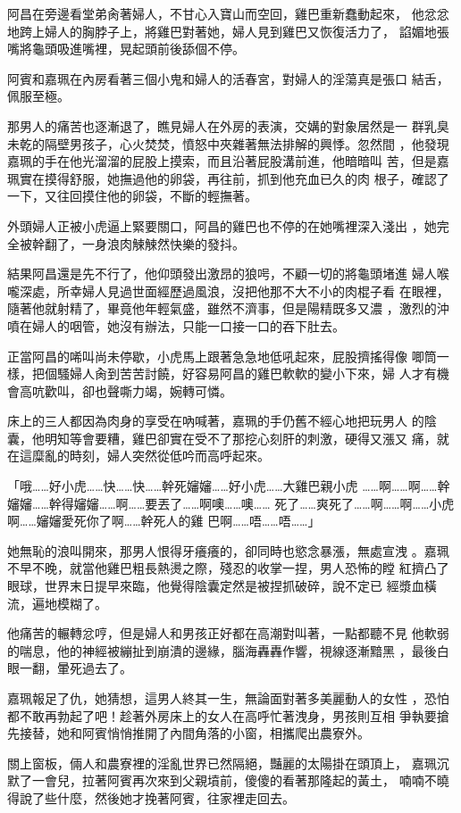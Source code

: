 阿昌在旁邊看堂弟肏著婦人，不甘心入寶山而空回，雞巴重新蠢動起來，
他忿忿地跨上婦人的胸脖子上，將雞巴對著她，婦人見到雞巴又恢復活力了，
諂媚地張嘴將龜頭吸進嘴裡，晃起頭前後舔個不停。

阿賓和嘉珮在內房看著三個小鬼和婦人的活春宮，對婦人的淫蕩真是張口
結舌，佩服至極。

那男人的痛苦也逐漸退了，瞧見婦人在外房的表演，交媾的對象居然是一
群乳臭未乾的隔壁男孩子，心火焚焚，憤怒中夾雜著無法排解的興悸。忽然間
，他發現嘉珮的手在他光溜溜的屁股上摸索，而且沿著屁股溝前進，他暗暗叫
苦，但是嘉珮實在摸得舒服，她撫過他的卵袋，再往前，抓到他充血已久的肉
根子，確認了一下，又往回摸住他的卵袋，不斷的輕撫著。

外頭婦人正被小虎逼上緊要關口，阿昌的雞巴也不停的在她嘴裡深入淺出
，她完全被幹翻了，一身浪肉觫觫然快樂的發抖。

結果阿昌還是先不行了，他仰頭發出激昂的狼呺，不顧一切的將龜頭堵進
婦人喉嚨深處，所幸婦人見過世面經歷過風浪，沒把他那不大不小的肉棍子看
在眼裡，隨著他就射精了，畢竟他年輕氣盛，雖然不濟事，但是陽精既多又濃
，激烈的沖噴在婦人的咽管，她沒有辦法，只能一口接一口的吞下肚去。

正當阿昌的唏叫尚未停歇，小虎馬上跟著急急地低吼起來，屁股擠搖得像
唧筒一樣，把個騷婦人肏到苦苦討饒，好容易阿昌的雞巴軟軟的變小下來，婦
人才有機會高吭歡叫，卻也聲嘶力竭，婉轉可憐。

床上的三人都因為肉身的享受在吶喊著，嘉珮的手仍舊不經心地把玩男人
的陰囊，他明知等會要糟，雞巴卻實在受不了那挖心刻肝的刺激，硬得又漲又
痛，就在這糜亂的時刻，婦人突然從低吟而高呼起來。

「哦……好小虎……快……快……幹死嬸嬸……好小虎……大雞巴親小虎
……啊……啊……幹嬸嬸……幹得嬸嬸……啊……要丟了……啊噢……噢……
死了……爽死了……啊……啊……小虎啊……嬸嬸愛死你了啊……幹死人的雞
巴啊……唔……唔……」

她無恥的浪叫開來，那男人恨得牙癢癢的，卻同時也慾念暴漲，無處宣洩
。嘉珮不早不晚，就當他雞巴粗長熱燙之際，殘忍的收掌一捏，男人恐怖的瞠
紅擠凸了眼球，世界末日提早來臨，他覺得陰囊定然是被捏抓破碎，說不定已
經漿血橫流，遍地模糊了。

他痛苦的輾轉忿哼，但是婦人和男孩正好都在高潮對叫著，一點都聽不見
他軟弱的喘息，他的神經被繃扯到崩潰的邊緣，腦海轟轟作響，視線逐漸黯黑
，最後白眼一翻，暈死過去了。

嘉珮報足了仇，她猜想，這男人終其一生，無論面對著多美麗動人的女性
，恐怕都不敢再勃起了吧！趁著外房床上的女人在高呼忙著洩身，男孩則互相
爭執要搶先接替，她和阿賓悄悄推開了內間角落的小窗，相攜爬出農寮外。

關上窗板，倆人和農寮裡的淫亂世界已然隔絕，豔麗的太陽掛在頭頂上，
嘉珮沉默了一會兒，拉著阿賓再次來到父親墳前，傻傻的看著那隆起的黃土，
喃喃不曉得說了些什麼，然後她才挽著阿賓，往家裡走回去。

